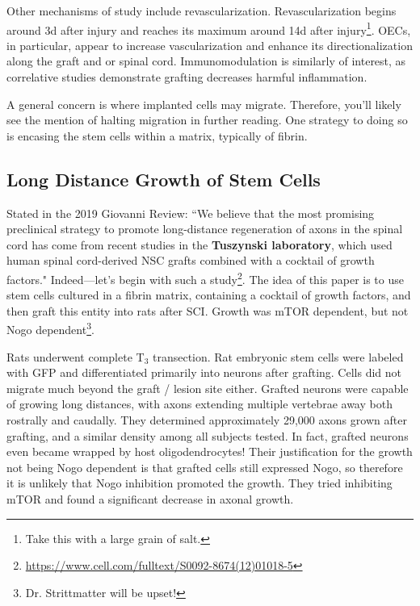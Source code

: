 Other mechanisms of study include revascularization. Revascularization begins around 3d after injury and reaches its maximum around 14d after injury\footnote{Take this with a large grain of salt.}. OECs, in particular, appear to increase vascularization and enhance its directionalization along the graft and or spinal cord. Immunomodulation is similarly of interest, as correlative studies demonstrate grafting decreases harmful inflammation.\newline

A general concern is where implanted cells may migrate. Therefore, you'll likely see the mention of halting migration in further reading. One strategy to doing so is encasing the stem cells within a matrix, typically of fibrin. 


\subsection{Long Distance Growth of Stem Cells}

Stated in the 2019 Giovanni Review: ``We believe that the most promising preclinical strategy to promote long-distance regeneration of axons in the spinal cord has come from recent studies in the \textbf{Tuszynski laboratory}, which used human spinal cord-derived NSC grafts combined with a cocktail of growth factors." Indeed---let's begin with such a study\footnote{\url{https://www.cell.com/fulltext/S0092-8674(12)01018-5}}. The idea of this paper is to use stem cells cultured in a fibrin matrix, containing a cocktail of growth factors, and then graft this entity into rats after SCI. Growth was mTOR dependent, but not Nogo dependent\footnote{Dr. Strittmatter will be upset!}.\newline

Rats underwent complete T$_3$ transection. Rat embryonic stem cells were labeled with GFP and differentiated primarily into neurons after grafting. Cells did not migrate much beyond the graft / lesion site either. Grafted neurons were capable of growing long distances, with axons extending multiple vertebrae away both rostrally and caudally. They determined approximately 29,000 axons grown after grafting, and a similar density among all subjects tested. In fact, grafted neurons even became wrapped by host oligodendrocytes! Their justification for the growth not being Nogo dependent is that grafted cells still expressed Nogo, so therefore it is unlikely that Nogo inhibition promoted the growth. They tried inhibiting mTOR and found a significant decrease in axonal growth.\newline

